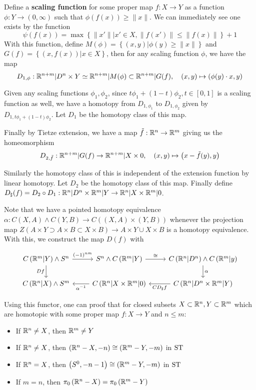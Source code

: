 Define a \textbf{scaling function} for some proper map $f:X\to Y$ as a function $\phi:Y\to(0,\infty)$ such that $\phi\left(f(x)\right)\geq\lVert x\rVert$. We can immediately see one exists by the function
\[\psi\left(f(x)\right)=\max\left\{\lVert x'\rVert\left|x'\in X,\lVert f(x')\rVert\leq\lVert f(x)\rVert\right.\right\}+1\]
With this function, define $M(\phi)=\left\{(x,y)|\phi(y)\geq\lVert x\rVert\right\}$ and $G(f)=\left\{(x,f(x))|x\in X\right\}$, then for any scaling function $\phi$, we have the map
\[D_{1,\phi}:\mathbb R^{n+m}|D^n\times Y\simeq\mathbb R^{n+m}|M(\phi)\subset\mathbb R^{n+m}|G(f),\quad(x,y)\mapsto\left(\phi(y)\cdot x,y\right)\]

Given any scaling functions $\phi_1,\phi_2$, since $t\phi_1+(1-t)\phi_2,t\in[0,1]$ is a scaling function as well, we have a homotopy from $D_{1,\phi_1}$ to $D_{1,\phi_2}$ given by $D_{1,t\phi_1+(1-t)\phi_2}$. Let $D_1$ be the homotopy class of this map.

Finally by Tietze extension, we have a map $\tilde f:\mathbb R^n\to\mathbb R^m$ giving us the homeomorphism
\[D_{2,\tilde f}:\mathbb R^{n+m}|G(f)\to\mathbb R^{n+m}|X\times 0,\quad(x,y)\mapsto\left(x-\tilde f(y),y\right)\]

Similarly the homotopy class of this is independent of the extension function by linear homotopy. Let $D_2$ be the homotopy class of this map. Finally define $D_\sharp(f)=D_2\circ D_1:\mathbb R^n|D^n\times\mathbb R^m|Y\to\mathbb R^n|X\times\mathbb R^m|0$.

Note that we have a pointed homotopy equivalence $\alpha:C(X,A)\wedge C(Y,B)\to C\left((X,A)\times(Y,B)\right)$ whenever the projection map $Z\left(A\times Y\supset A\times B\subset X\times B\right)\to A\times Y\cup X\times B$ is a homotopy equivalence. With this, we construct the map $D(f)$ with

\[\begin{tikzcd}
    C\left(\mb R^m|Y\right)\wedge S^n & S^n\wedge C\left(\mb R^m|Y\right) & C\left(\mb R^n|D^n\right)\wedge C\left(\mb R^m|y\right) \\
    C\left(\mb R^n|X\right)\wedge S^m & C\left(\mb R^n|X\times\mb R^m|0\right) & C\left(\mb R^n|D^n\times\mb R^m|Y\right)
	\arrow["{(-1)^{nm}}", from=1-1, to=1-2]
	\arrow["\cong", from=1-2, to=1-3]
	\arrow["\alpha", from=1-3, to=2-3]
	\arrow["{CD_\sharp f}", from=2-3, to=2-2]
	\arrow["{\alpha^{-1}}", from=2-2, to=2-1]
	\arrow["Df"', from=1-1, to=2-1]
\end{tikzcd}\]

Using this functor, one can proof that for closed subsets $X\subset\mathbb R^n,Y\subset\mathbb R^m$ which are homotopic with some proper map $f:X\to Y$ and $n\leq m$:
\begin{itemize}
    \item If $\mathbb R^n\neq X$, then $\mathbb R^m\neq Y$
    \item If $\mathbb R^n\neq X$, then $\left(\mathbb R^n-X,-n\right)\cong\left(\mathbb R^m-Y,-m\right)$ in $\operatorname{ST}$
    \item If $\mathbb R^n=X$, then $\left(S^0,-n-1\right)\cong\left(\mathbb R^m-Y,-m\right)$ in $\operatorname{ST}$
    \item If $m=n$, then $\pi_0\left(\mathbb R^n-X\right)=\pi_0\left(\mathbb R^m-Y\right)$
\end{itemize}

